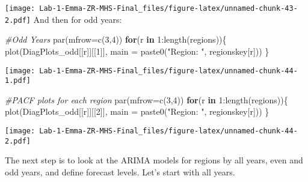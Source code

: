\documentclass[
]{article}
\newenvironment{Shaded}{\begin{snugshade}}{\end{snugshade}}
\newcommand{\AttributeTok}[1]{\textcolor[rgb]{0.77,0.63,0.00}{#1}}
\newcommand{\CommentTok}[1]{\textcolor[rgb]{0.56,0.35,0.01}{\textit{#1}}}
\newcommand{\ConstantTok}[1]{\textcolor[rgb]{0.00,0.00,0.00}{#1}}
\newcommand{\ControlFlowTok}[1]{\textcolor[rgb]{0.13,0.29,0.53}{\textbf{#1}}}
\newcommand{\DecValTok}[1]{\textcolor[rgb]{0.00,0.00,0.81}{#1}}
\newcommand{\FunctionTok}[1]{\textcolor[rgb]{0.00,0.00,0.00}{#1}}
\newcommand{\NormalTok}[1]{#1}
\newcommand{\OtherTok}[1]{\textcolor[rgb]{0.56,0.35,0.01}{#1}}
\newcommand{\SpecialCharTok}[1]{\textcolor[rgb]{0.00,0.00,0.00}{#1}}
\newcommand{\StringTok}[1]{\textcolor[rgb]{0.31,0.60,0.02}{#1}}
\begin{document}
\texttt{[image: Lab-1-Emma-ZR-MHS-Final\_files/figure-latex/unnamed-chunk-43-2.pdf]}
And then for odd years:

\begin{Shaded}
\begin{Highlighting}[]
\CommentTok{\#Odd Years }
\FunctionTok{par}\NormalTok{(}\AttributeTok{mfrow=}\FunctionTok{c}\NormalTok{(}\DecValTok{3}\NormalTok{,}\DecValTok{4}\NormalTok{))}
\ControlFlowTok{for}\NormalTok{(r }\ControlFlowTok{in} \DecValTok{1}\SpecialCharTok{:}\FunctionTok{length}\NormalTok{(regions))\{}
  \FunctionTok{plot}\NormalTok{(DiagPlots\_odd[[r]][[}\DecValTok{1}\NormalTok{]], }\AttributeTok{main =} \FunctionTok{paste0}\NormalTok{(}\StringTok{"Region: "}\NormalTok{, regionskey[r]))}
\NormalTok{\}}
\end{Highlighting}
\end{Shaded}

\texttt{[image: Lab-1-Emma-ZR-MHS-Final\_files/figure-latex/unnamed-chunk-44-1.pdf]}

\begin{Shaded}
\begin{Highlighting}[]
\CommentTok{\#PACF plots for each region}
\FunctionTok{par}\NormalTok{(}\AttributeTok{mfrow=}\FunctionTok{c}\NormalTok{(}\DecValTok{3}\NormalTok{,}\DecValTok{4}\NormalTok{))}
\ControlFlowTok{for}\NormalTok{(r }\ControlFlowTok{in} \DecValTok{1}\SpecialCharTok{:}\FunctionTok{length}\NormalTok{(regions))\{}
  \FunctionTok{plot}\NormalTok{(DiagPlots\_odd[[r]][[}\DecValTok{2}\NormalTok{]], }\AttributeTok{main =} \FunctionTok{paste0}\NormalTok{(}\StringTok{"Region: "}\NormalTok{, regionskey[r]))}
\NormalTok{\}}
\end{Highlighting}
\end{Shaded}

\texttt{[image: Lab-1-Emma-ZR-MHS-Final\_files/figure-latex/unnamed-chunk-44-2.pdf]}

The next step is to look at the ARIMA models for regions by all years,
even and odd years, and define forecast levels. Let's start with all
years.

\begin{Shaded}
\end{Shaded}
\end{document}
